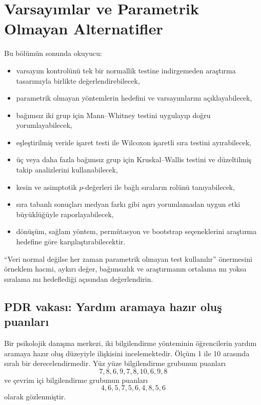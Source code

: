 \chapter{Varsayımlar ve Parametrik Olmayan Alternatifler}

\begin{hedefler}
Bu bölümün sonunda okuyucu:
\begin{itemize}
  \item varsayım kontrolünü tek bir normallik testine indirgemeden araştırma tasarımıyla birlikte değerlendirebilecek,
  \item parametrik olmayan yöntemlerin hedefini ve varsayımlarını açıklayabilecek,
  \item bağımsız iki grup için Mann--Whitney testini uygulayıp doğru yorumlayabilecek,
  \item eşleştirilmiş veride işaret testi ile Wilcoxon işaretli sıra testini ayırabilecek,
  \item üç veya daha fazla bağımsız grup için Kruskal--Wallis testini ve düzeltilmiş takip analizlerini kullanabilecek,
  \item kesin ve asimptotik $p$-değerleri ile bağlı sıraların rolünü tanıyabilecek,
  \item sıra tabanlı sonuçları medyan farkı gibi aşırı yorumlamadan uygun etki büyüklüğüyle raporlayabilecek,
  \item dönüşüm, sağlam yöntem, permütasyon ve bootstrap seçeneklerini araştırma hedefine göre karşılaştırabilecektir.
\end{itemize}
\end{hedefler}

\begin{hazirlik}
``Veri normal değilse her zaman parametrik olmayan test kullanılır'' önermesini
örneklem hacmi, aykırı değer, bağımsızlık ve araştırmanın ortalama mı yoksa
sıralama mı hedeflediği açısından değerlendirin.
\end{hazirlik}

\section{PDR vakası: Yardım aramaya hazır oluş puanları}

Bir psikolojik danışma merkezi, iki bilgilendirme yönteminin öğrencilerin
yardım aramaya hazır oluş düzeyiyle ilişkisini incelemektedir. Ölçüm 1 ile 10
arasında sıralı bir derecelendirmedir. Yüz yüze bilgilendirme grubunun puanları
\[
7,8,6,9,7,8,10,6,9,8
\]
ve çevrim içi bilgilendirme grubunun puanları
\[
4,6,5,7,5,6,4,8,5,6
\]
olarak gözlenmiştir.

